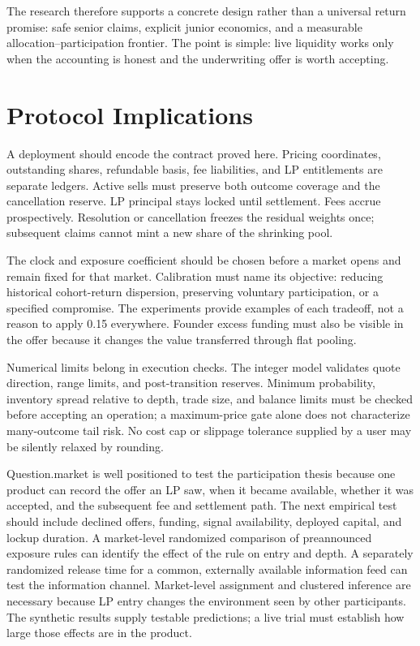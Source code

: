\documentclass[10pt]{article}
\begin{document}
The research therefore supports a concrete design rather than a universal return promise: safe senior claims, explicit junior economics, and a measurable allocation--participation frontier. The point is simple: live liquidity works only when the accounting is honest and the underwriting offer is worth accepting.

\section{Protocol Implications}

A deployment should encode the contract proved here. Pricing coordinates, outstanding shares, refundable basis, fee liabilities, and LP entitlements are separate ledgers. Active sells must preserve both outcome coverage and the cancellation reserve. LP principal stays locked until settlement. Fees accrue prospectively. Resolution or cancellation freezes the residual weights once; subsequent claims cannot mint a new share of the shrinking pool.

The clock and exposure coefficient should be chosen before a market opens and remain fixed for that market. Calibration must name its objective: reducing historical cohort-return dispersion, preserving voluntary participation, or a specified compromise. The experiments provide examples of each tradeoff, not a reason to apply 0.15 everywhere. Founder excess funding must also be visible in the offer because it changes the value transferred through flat pooling.

Numerical limits belong in execution checks. The integer model validates quote direction, range limits, and post-transition reserves. Minimum probability, inventory spread relative to depth, trade size, and balance limits must be checked before accepting an operation; a maximum-price gate alone does not characterize many-outcome tail risk. No cost cap or slippage tolerance supplied by a user may be silently relaxed by rounding.

Question.market is well positioned to test the participation thesis because one product can record the offer an LP saw, when it became available, whether it was accepted, and the subsequent fee and settlement path. The next empirical test should include declined offers, funding, signal availability, deployed capital, and lockup duration. A market-level randomized comparison of preannounced exposure rules can identify the effect of the rule on entry and depth. A separately randomized release time for a common, externally available information feed can test the information channel. Market-level assignment and clustered inference are necessary because LP entry changes the environment seen by other participants. The synthetic results supply testable predictions; a live trial must establish how large those effects are in the product.
\end{document}
